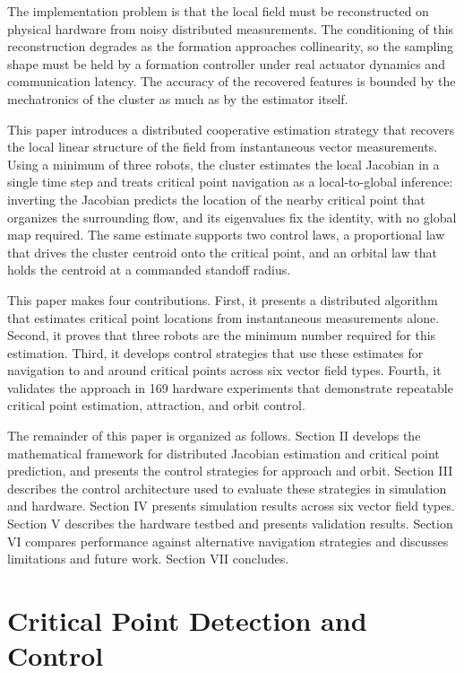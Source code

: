 \documentclass[lettersize,journal]{IEEEtran}
\begin{document}
The implementation problem is that the local field must be reconstructed on physical hardware from noisy distributed measurements. The conditioning of this reconstruction degrades as the formation approaches collinearity, so the sampling shape must be held by a formation controller under real actuator dynamics and communication latency. The accuracy of the recovered features is bounded by the mechatronics of the cluster as much as by the estimator itself.

This paper introduces a distributed cooperative estimation strategy that recovers the local linear structure of the field from instantaneous vector measurements. Using a minimum of three robots, the cluster estimates the local Jacobian in a single time step and treats critical point navigation as a local-to-global inference: inverting the Jacobian predicts the location of the nearby critical point that organizes the surrounding flow, and its eigenvalues fix the identity, with no global map required. The same estimate supports two control laws, a proportional law that drives the cluster centroid onto the critical point, and an orbital law that holds the centroid at a commanded standoff radius.

This paper makes four contributions. First, it presents a distributed algorithm that estimates critical point locations from instantaneous measurements alone. Second, it proves that three robots are the minimum number required for this estimation. Third, it develops control strategies that use these estimates for navigation to and around critical points across six vector field types. Fourth, it validates the approach in 169 hardware experiments that demonstrate repeatable critical point estimation, attraction, and orbit control.

The remainder of this paper is organized as follows. Section II develops the mathematical framework for distributed Jacobian estimation and critical point prediction, and presents the control strategies for approach and orbit. Section III describes the control architecture used to evaluate these strategies in simulation and hardware. Section IV presents simulation results across six vector field types. Section V describes the hardware testbed and presents validation results. Section VI compares performance against alternative navigation strategies and discusses limitations and future work. Section VII concludes.

\section{Critical Point Detection and Control}
\end{document}

